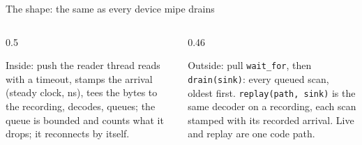 \documentclass[aspectratio=169,11pt]{beamer}
\begin{document}
\begin{frame}{The shape: the same as every device mipe drains}
  \begin{center}
  \end{center}
  \begin{columns}[T]
    \begin{column}{0.5\textwidth}
      \begin{block}{Inside: push}
        the reader thread reads with a timeout, stamps the arrival (steady clock, ns), tees the bytes to the recording, decodes, queues; the queue is bounded and counts what it drops; it reconnects by itself.
      \end{block}
    \end{column}
    \begin{column}{0.46\textwidth}
      \begin{block}{Outside: pull}
        \texttt{wait\_for}, then \texttt{drain(sink)}: every queued scan, oldest first. \texttt{replay(path, sink)} is the same decoder on a recording, each scan stamped with its recorded arrival. Live and replay are one code path.
      \end{block}
    \end{column}
  \end{columns}
\end{frame}
\end{document}
